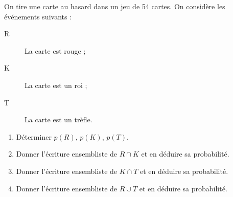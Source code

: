 
On tire une carte au hasard dans un jeu de 54 cartes. On considère les événements suivants :

\begin{description}
\item[R] La carte est rouge ;
\item[K] La carte est un roi ;
\item[T] La carte est un trèfle.
\end{description}

\begin{enumerate}
\item Déterminer $p(R)$, $p(K)$, $p(T)$. 
\item Donner l'écriture ensembliste de $R \cap K$ et en déduire sa probabilité. 
\item Donner l'écriture ensembliste de $K \cap T$ et en déduire sa probabilité.
\item Donner l'écriture ensembliste de $R \cup T$ et en déduire sa probabilité.
\end{enumerate}